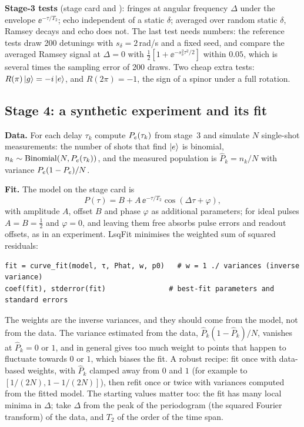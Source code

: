 \textbf{Stage-3 tests} (stage card and ): fringes at angular
frequency $\Delta$ under the envelope $\ee^{-\tau/T_2}$; echo independent of a static
$\delta$; averaged over random static $\delta$, Ramsey decays and echo does not. The last
test needs numbers: the reference tests draw 200 detunings with $s_\delta = 2$\,rad/\textmu s
and a fixed seed, and compare the averaged Ramsey signal at $\Delta = 0$ with
$\frac12[1 + \ee^{-s_\delta^2\tau^2/2}]$ within $0.05$, which is several times the
sampling error of 200 draws. Two cheap extra tests: $R(\pi)\ket{g} = -i\ket{e}$, and
$R(2\pi) = -1$, the sign of a spinor under a full rotation.

\subsection{Stage 4: a synthetic experiment and its fit}\label{sec:stage4}

\textbf{Data.} For each delay $\tau_k$ compute $P_e(\tau_k)$ from stage~3 and simulate $N$
single-shot measurements: the number of shots that find $\ket{e}$ is binomial,
$n_k \sim \mathrm{Binomial}(N, P_e(\tau_k))$, and the measured population is
$\hat P_k = n_k/N$ with variance $P_e(1 - P_e)/N$.

\textbf{Fit.} The model on the stage card is
\begin{equation}\label{eq:fitmodel}
  P(\tau) = B + A\,\ee^{-\tau/T_2}\cos(\Delta\tau + \varphi),
\end{equation}
with amplitude $A$, offset $B$ and phase $\varphi$ as additional parameters; for ideal pulses
$A = B = \frac12$ and $\varphi = 0$, and leaving them free absorbs pulse errors and
readout offsets, as in an experiment. LsqFit  minimises the weighted sum of
squared residuals:
\begin{lstlisting}
fit = curve_fit(model, τ, Phat, w, p0)   # w = 1 ./ variances (inverse variance)
coef(fit), stderror(fit)               # best-fit parameters and standard errors
\end{lstlisting}
The weights are the inverse variances, and they should come from the model, not from
the data. The variance estimated from the data, $\hat P_k(1 - \hat P_k)/N$, vanishes at
$\hat P_k = 0$ or $1$, and in general gives too much weight to points that happen to
fluctuate towards $0$ or $1$, which biases the fit. A robust recipe: fit once with
data-based weights, with $\hat P_k$ clamped away from $0$ and $1$ (for example to
$[1/(2N), 1 - 1/(2N)]$), then refit once or twice with variances computed from the fitted
model. The starting values  matter too: the fit has many local minima in $\Delta$;
take $\Delta$ from the peak of the periodogram (the squared Fourier transform) of the data,
and $T_2$ of the order of the time span.

